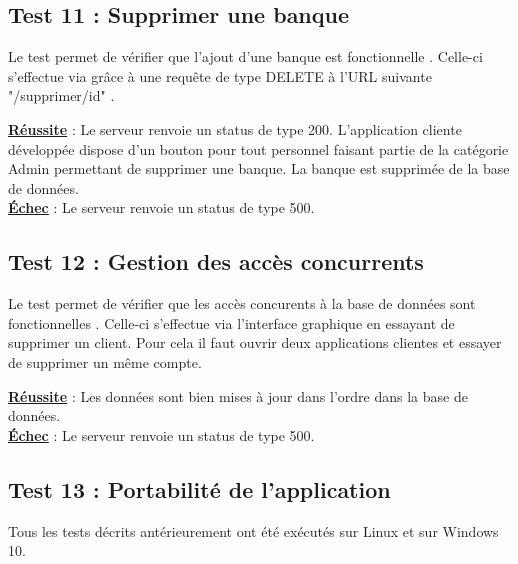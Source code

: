 \subsection{Test 11 : Supprimer une banque}

Le test permet de vérifier que l'ajout d'une banque est fonctionnelle .
Celle-ci s'effectue via grâce à une requête de type DELETE à l'URL suivante "/supprimer/{id}" .

\textbf{\underline{Réussite}} : Le serveur renvoie un status de type 200.
L'application cliente développée dispose d'un bouton pour tout personnel faisant partie de la catégorie Admin permettant de supprimer une banque. La banque est supprimée de la base de données.
\\
\textbf{\underline{Échec}} : Le serveur renvoie un status de type 500.

\subsection{Test 12 : Gestion des accès concurrents}

Le test permet de vérifier que les accès concurents à la base de données sont fonctionnelles .
Celle-ci s'effectue via l'interface graphique en essayant de supprimer un client.
Pour cela il faut ouvrir deux applications clientes et essayer de supprimer un même compte.

\textbf{\underline{Réussite}} : Les données sont bien mises à jour dans l'ordre dans la base de données.
\\
\textbf{\underline{Échec}} : Le serveur renvoie un status de type 500.

\subsection{Test 13 : Portabilité de l'application}

Tous les tests décrits antérieurement ont été exécutés sur Linux et sur Windows 10.
